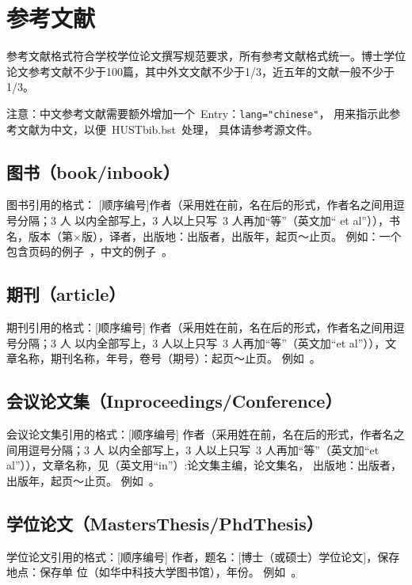 \section{参考文献}
参考文献格式符合学校学位论文撰写规范要求，所有参考文献格式统一。博士学位论文参考文献不少于100篇，其中外文文献不少于1/3，近五年的文献一般不少于1/3。

注意：中文参考文献需要额外增加一个~Entry：\verb|lang="chinese"|，
用来指示此参考文献为中文，以便~HUSTbib.bst~处理， 具体请参考源文件。

\subsection{图书（book/inbook）}

图书引用的格式：
[顺序编号]作者（采用姓在前，名在后的形式，作者名之间用逗号分隔；3 人
以内全部写上，3 人以上只写~3 人再加“等”（英文加“ et
al”）），书名，版本（第×版），译者，出版地：出版者，出版年，起页～止页。
例如：一个包含页码的例子~\cite{Collin}，中文的例子~\cite{AIS}。

\subsection{期刊（article）}

期刊引用的格式：[顺序编号]
作者（采用姓在前，名在后的形式，作者名之间用逗号分隔；3 人
以内全部写上，3 人以上只写~3 人再加“等”（英文加“et
al”）），文章名称，期刊名称，年号，卷号（期号）：起页～止页。
例如~。

\subsection{会议论文集（Inproceedings/Conference）}

会议论文集引用的格式：[顺序编号]
作者（采用姓在前，名在后的形式，作者名之间用逗号分隔；3 人
以内全部写上，3 人以上只写~3 人再加“等”（英文加“et
al”）），文章名称，见（英文用“in”）:论文集主编，论文集名，
出版地：出版者，出版年，起页～止页。
例如~。


\subsection{学位论文（MastersThesis/PhdThesis）}

学位论文引用的格式：[顺序编号]
作者，题名：[博士（或硕士）学位论文]，保存地点：保存单
位（如华中科技大学图书馆），年份。
例如~。

